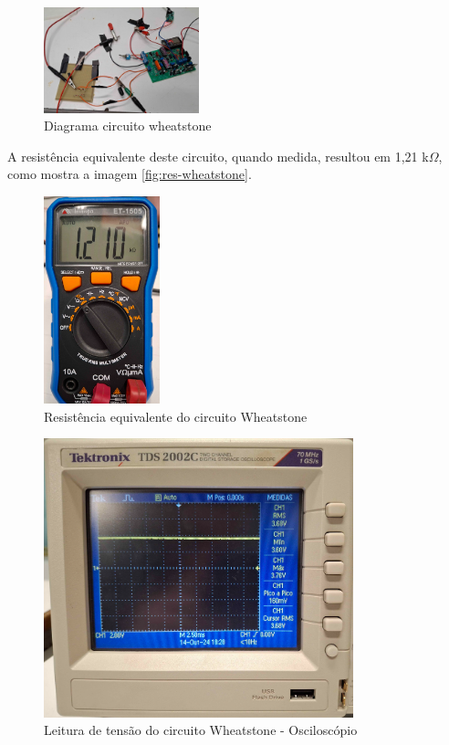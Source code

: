 \begin{figure}[htb!]
    \caption{Diagrama circuito wheatstone}
    \label{fig:circuito-wheatstone-full}
    \includegraphics[width=0.4\textwidth]{figuras/circuito-wheatstone-full.png}
    \fonte{}
\end{figure}

A resistência equivalente deste circuito, quando medida, resultou em 1,21 k$\Omega$, como mostra a imagem \autoref{fig:res-wheatstone}.

\begin{figure}[htb!]
    \caption{Resistência equivalente do circuito Wheatstone}
    \label{fig:res-wheatstone}
    \includegraphics[width=0.3\textwidth]{figuras/res-wheatstone.png}
    \fonte{}
\end{figure}

\begin{figure}[htb!]
    \caption{Leitura de tensão do circuito Wheatstone - Osciloscópio}
    \label{fig:wheatstone-osc}
    \includegraphics[width=0.8\textwidth]{figuras/wheatstone-osc.png}
    \fonte{}
\end{figure}

